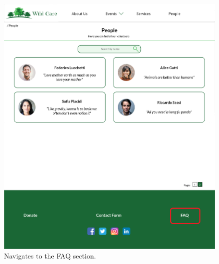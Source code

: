 	\begin{figure}[h!]
		\centering
		\begin{minipage}[b]{1\textwidth}
    			\includegraphics[width=\textwidth]{./assets/mockups/people_faq.png}
			\caption{Navigates to the FAQ section.}
		\end{minipage}
	\end{figure}

